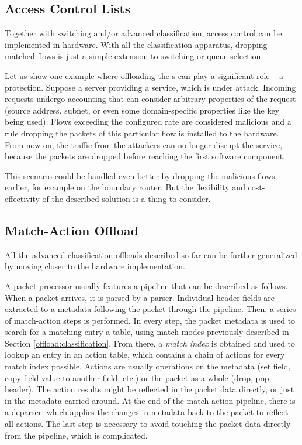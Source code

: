 \subsection{Access Control Lists}

Together with switching and/or advanced classification, access control can
be implemented in hardware. With all the classification apparatus, dropping
matched flows is just a simple extension to switching or queue selection.

Let us show one example where offloading the s can play a significant
role -- a  protection. Suppose a server providing a service, which is
under  attack. Incoming requests undergo accounting that can consider
arbitrary properties of the request (source address, subnet, or even
some domain-specific properties like the  key being used). Flows
exceeding the configured rate are considered malicious and a rule dropping the
packets of this particular flow is installed to the hardware. From now on, the traffic from the
attackers can no longer disrupt the service, because the packets are dropped
before reaching the first software component.

This scenario could be handled even better by dropping the malicious flows earlier, for
example on the boundary router. But the flexibility and cost-effectivity of the
described solution is a thing to consider.

\subsection{Match-Action Offload}
\label{offload:match-action}

All the advanced classification offloads described so far can be further
generalized by moving closer to the hardware implementation.

A packet processor usually features a pipeline that can be described as
follows. When a packet arrives, it is parsed by a parser.
Individual header fields are extracted to a metadata following the packet
through the pipeline. Then, a series of match-action steps is performed. In
every step, the packet metadata is used to search for a matching entry a table,
using match modes previously described in Section \ref{offload:classification}.
From there, a \emph{match index} is obtained and used to lookup an entry in an
action table, which
contains a chain of actions for every match index possible. Actions are usually
operations on the metadata (set field, copy field value to another field, etc.)
or the packet as a whole (drop, pop header). The action results might be
reflected in the packet data directly, or just in the metadata carried around.
At the end of the match-action pipeline, there is a deparser, which applies
the changes in metadata back to the packet to reflect all actions. The last step is
necessary to avoid touching the packet data directly from the pipeline, which
is complicated.

